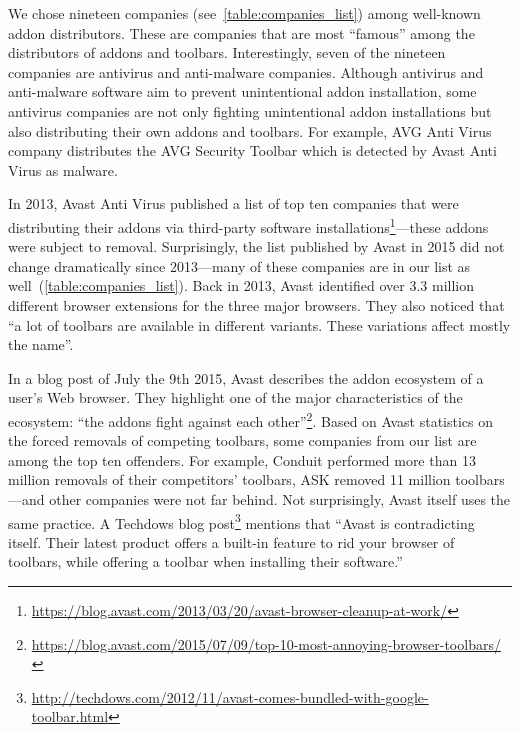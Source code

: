 \documentclass[ijoc,nonblindrev]{informs3} %
\numberwithin{equation}{subsection}
\begin{document}
We chose nineteen companies (see~\autoref{table:companies_list}) among well-known addon distributors. These are companies that are most ``famous'' among the distributors of addons and toolbars. Interestingly, seven of the nineteen companies are antivirus and anti-malware companies. 
Although antivirus and anti-malware software aim to prevent unintentional addon installation, some antivirus companies are not only fighting unintentional addon installations but also distributing their own addons and toolbars. For example, AVG Anti Virus company distributes the AVG Security Toolbar which is detected by Avast Anti Virus as malware.  

In 2013, Avast Anti Virus published a list of top ten companies that were distributing their addons via third-party software installations\footnote{\url{https://blog.avast.com/2013/03/20/avast-browser-cleanup-at-work/}}---these addons were subject to removal. Surprisingly, the list published by Avast in 2015 did not change dramatically since 2013---many of these companies are in our list as well~(\autoref{table:companies_list}). Back in 2013, Avast identified over 3.3 million different browser extensions for the three major browsers. They also noticed that ``a lot of toolbars are available in different variants. These variations affect mostly the name''. 

In a blog post of July the 9th 2015, Avast describes the addon ecosystem of a user's Web browser. They highlight one of the major characteristics of the ecosystem: ``the addons fight against each other''\footnote{\url{https://blog.avast.com/2015/07/09/top-10-most-annoying-browser-toolbars/}}.
Based on Avast statistics on the forced removals of competing toolbars, some companies from our list are among the top ten offenders. For example, Conduit performed more than 13 million removals of their competitors' toolbars, ASK removed 11 million toolbars---and other companies were not far behind. Not surprisingly, Avast itself uses the same practice. A Techdows blog post\footnote{\url{http://techdows.com/2012/11/avast-comes-bundled-with-google-toolbar.html}} mentions that ``Avast is contradicting itself. Their latest product offers a built-in feature to rid your browser of toolbars, while offering a toolbar when installing their software.''
\end{document}
